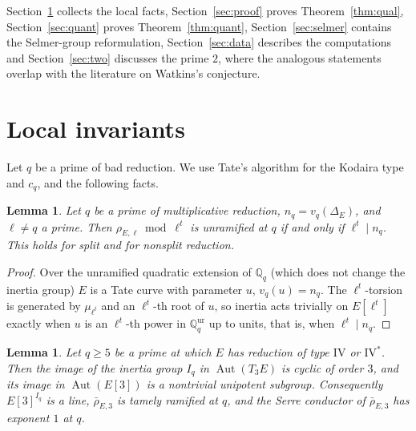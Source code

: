 \documentclass[11pt]{amsart}
\newtheorem{lemma}[theorem]{Lemma}
\theoremstyle{definition}
\newcommand{\Q}{\mathbb{Q}}
\begin{document}
Section~\ref{sec:local} collects the local facts, Section~\ref{sec:proof} proves Theorem~\ref{thm:qual}, Section~\ref{sec:quant} proves Theorem~\ref{thm:quant}, Section~\ref{sec:selmer} contains the Selmer-group reformulation, Section~\ref{sec:data} describes the computations and Section~\ref{sec:two} discusses the prime $2$, where the analogous statements overlap with the literature on Watkins's conjecture.

\section{Local invariants}\label{sec:local}

Let $q$ be a prime of bad reduction. We use Tate's algorithm \cite[IV.9]{SilvermanATAEC} for the Kodaira type and $c_q$, and the following facts.

\begin{lemma}\label{lem:tamagawa-exp}
Let $q$ be a prime of multiplicative reduction, $n_q=v_q(\Delta_E)$, and $\ell\ne q$ a prime. Then $\rho_{E,\ell}\bmod\ell^t$ is unramified at $q$ if and only if $\ell^t\mid n_q$. This holds for split and for nonsplit reduction.
\end{lemma}

\begin{proof}
Over the unramified quadratic extension of $\Q_q$ (which does not change the inertia group) $E$ is a Tate curve with parameter $u$, $v_q(u)=n_q$. The $\ell^t$-torsion is generated by $\mu_{\ell^t}$ and an $\ell^t$-th root of $u$, so inertia acts trivially on $E[\ell^t]$ exactly when $u$ is an $\ell^t$-th power in $\Q_q^{\mathrm{ur}}$ up to units, that is, when $\ell^t\mid n_q$.
\end{proof}

\begin{lemma}\label{lem:IV}
Let $q\ge5$ be a prime at which $E$ has reduction of type $\mathrm{IV}$ or $\mathrm{IV}^*$. Then the image of the inertia group $I_q$ in $\operatorname{Aut}(T_3E)$ is cyclic of order $3$, and its image in $\operatorname{Aut}(E[3])$ is a nontrivial unipotent subgroup. Consequently $E[3]^{I_q}$ is a line, $\bar\rho_{E,3}$ is tamely ramified at $q$, and the Serre conductor of $\bar\rho_{E,3}$ has exponent $1$ at $q$.
\end{lemma}
\end{document}

